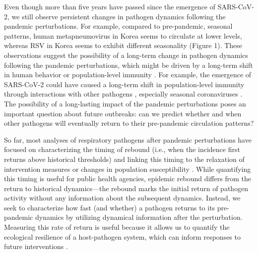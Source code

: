\documentclass[12pt]{article}
\begin{document}
Even though more than five years have passed since the emergence of SARS-CoV-2, we still observe persistent changes in pathogen dynamics following the pandemic perturbations.
For example, compared to pre-pandemic, seasonal patterns, human metapneumovirus in Korea seems to circulate at lower levels, whereas RSV in Korea seems to exhibit different seasonality (Figure 1).
These observations suggest the possibility of a long-term change in pathogen dynamics following the pandemic perturbations, which might be driven by a long-term shift in human behavior or population-level immunity \citep{kissler2020projecting,baker2022long}.
For example, the emergence of SARS-CoV-2 could have caused a long-term shift in population-level immunity through interactions with other pathogens \citep{swets2022sars}, especially seasonal coronaviruses \citep{kissler2020projecting,lin2022pre,murray2023impact}.
The possibility of a long-lasting impact of the pandemic perturbations poses an important question about future outbreaks: can we predict whether and when other pathogens will eventually return to their pre-pandemic circulation patterns?

So far, most analyses of respiratory pathogens after pandemic perturbations have focused on characterizing the timing of rebound (i.e., when the incidence first returns above historical thresholds) and linking this timing to the relaxation of intervention measures or changes in population susceptibility \citep{baker2020impact,eden2022off,perofsky2024impacts}.
While quantifying this timing is useful for public health agencies, epidemic rebound differs from the return to historical dynamics---the rebound marks the initial return of pathogen activity without any information about the subsequent dynamics.
Instead, we seek to characterize how fast (and whether) a pathogen returns to its pre-pandemic dynamics by utilizing dynamical information after the perturbation.
Measuring this rate of return is useful because it allows us to quantify the ecological resilience of a host-pathogen system, which can inform responses to future interventions \citep{pimm1979structure, neubert1997alternatives,gunderson2000ecological,dakos2022ecological}.
\end{document}
